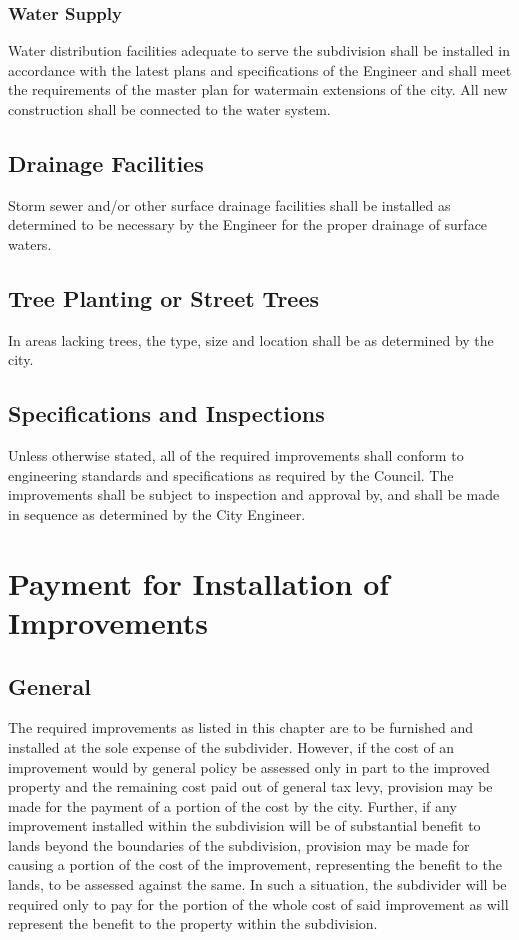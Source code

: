 \subsubsection{Water Supply}
Water distribution facilities adequate to serve the subdivision shall be installed in accordance with the latest plans and specifications of the Engineer and shall meet the requirements of the master plan for watermain extensions of the city. All new construction shall be connected to the water system.
\subsection{Drainage Facilities}
Storm sewer and/or other surface drainage facilities shall be installed as determined to be necessary by the Engineer for the proper drainage of surface waters.
\subsection{Tree Planting or Street Trees}
In areas lacking trees, the type, size and location shall be as determined by the city.
\subsection{Specifications and Inspections}
Unless otherwise stated, all of the required improvements shall conform to engineering standards and specifications as required by the Council. The improvements shall be subject to inspection and approval by, and shall be made in sequence as determined by the City Engineer.

\section{Payment for Installation of Improvements}
\subsection{General}
The required improvements as listed in this chapter are to be furnished and installed at the sole expense of the subdivider. However, if the cost of an improvement would by general policy be assessed only in part to the improved property and the remaining cost paid out of general tax levy, provision may be made for the payment of a portion of the cost by the city. Further, if any improvement installed within the subdivision will be of substantial benefit to lands beyond the boundaries of the subdivision, provision may be made for causing a portion of the cost of the improvement, representing the benefit to the lands, to be assessed against the same. In such a situation, the subdivider will be required only to pay for the portion of the whole cost of said improvement as will represent the benefit to the property within the subdivision.
